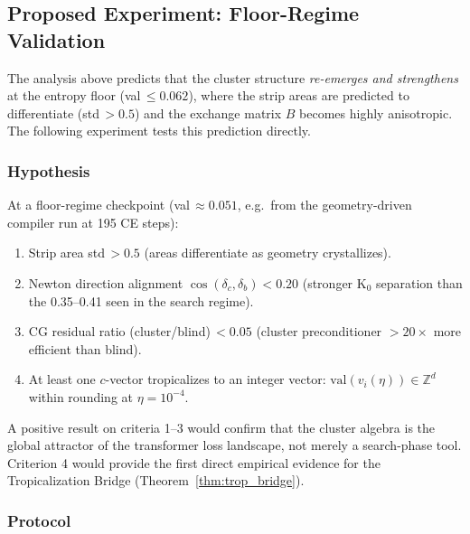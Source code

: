 \documentclass[11pt]{amsart}
\begin{document}
\subsection{Proposed Experiment: Floor-Regime Validation}
\label{sec:floor_experiment}

The analysis above predicts that the cluster structure
\emph{re-emerges and strengthens} at the entropy floor (val\,$\leq 0.062$),
where the strip areas are predicted to differentiate (std\,$> 0.5$) and
the exchange matrix $B$ becomes highly anisotropic.
The following experiment tests this prediction directly.

\subsubsection*{Hypothesis}

At a floor-regime checkpoint (val\,$\approx 0.051$,
e.g.\ from the geometry-driven compiler run at 195 CE steps):
\begin{enumerate}
\item Strip area std\,$> 0.5$ (areas differentiate as geometry crystallizes).
\item Newton direction alignment $\cos(\delta_c, \delta_b) < 0.20$
  (stronger K$_0$ separation than the 0.35--0.41 seen in the search regime).
\item CG residual ratio (cluster/blind)\,$< 0.05$
  (cluster preconditioner $>20\times$ more efficient than blind).
\item At least one $c$-vector tropicalizes to an integer vector:
  $\mathrm{val}(v_i(\eta)) \in \mathbb{Z}^d$ within rounding at $\eta=10^{-4}$.
\end{enumerate}
A positive result on criteria 1--3 would confirm that the cluster
algebra is the global attractor of the transformer loss landscape,
not merely a search-phase tool.
Criterion 4 would provide the first direct empirical evidence for the
Tropicalization Bridge (Theorem~\ref{thm:trop_bridge}).

\subsubsection*{Protocol}
\end{document}
